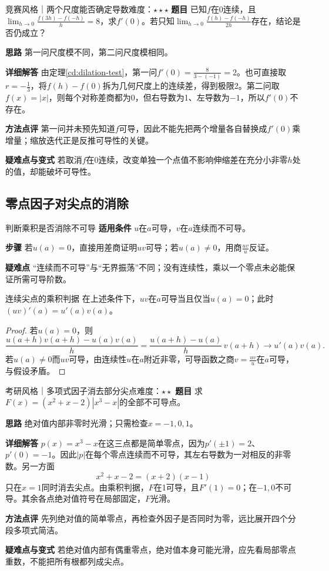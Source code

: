 \begin{example}{竞赛风格｜两个尺度能否确定导数}{难度：$\star\star\star$}\label{cd:ex:dilation}
\textbf{题目} 已知$f$在0连续，且$\lim_{h\to0}\frac{f(3h)-f(-h)}{h}=8$，求$f'(0)$。若只知$\lim_{h\to0}\frac{f(h)-f(-h)}{2h}$存在，结论是否仍成立？\par
\textbf{思路} 第一问尺度模不同，第二问尺度模相同。\par
\textbf{详细解答} 由定理\ref{cd:dilation-test}，第一问$f'(0)=\frac{8}{3-(-1)}=2$。也可直接取$r=-\frac{1}{3}$，将$f(h)-f(0)$拆为几何尺度上的连续差，得到极限2。第二问取$f(x)=|x|$，则每个对称差商都为0，但右导数为1、左导数为$-1$，所以$f'(0)$不存在。\par
\textbf{方法点评} 第一问并未预先知道$f$可导，因此不能先把两个增量各自替换成$f'(0)$乘增量；缩放迭代正是反推可导性的关键。\par
\textbf{疑难点与变式} 若取消$f$在0连续，改变单独一个点值不影响伸缩差在充分小非零$h$处的值，却能破坏可导性。
\end{example}

\subsection{零点因子对尖点的消除}
\begin{method}{判断乘积是否消除不可导}
\textbf{适用条件} $u$在$a$可导，$v$在$a$连续而不可导。\par
\textbf{步骤} 若$u(a)=0$，直接用差商证明$uv$可导；若$u(a)\ne0$，用商$\frac{uv}{u}$反证。\par
\textbf{疑难点} “连续而不可导”与“无界振荡”不同；没有连续性，乘以一个零点未必能保证所需可导阶数。
\end{method}
\begin{theorem}{连续尖点的乘积判据}
在上述条件下，$uv$在$a$可导当且仅当$u(a)=0$；此时$(uv)'(a)=u'(a)v(a)$。
\end{theorem}
\begin{proof}
若$u(a)=0$，则
\[
 \dfrac{u(a+h)v(a+h)-u(a)v(a)}h
 =\dfrac{u(a+h)-u(a)}h\,v(a+h)\to u'(a)v(a).
\]
若$u(a)\ne0$而$uv$可导，由连续性$u$在$a$附近非零，可导函数之商$v=\frac{uv}{u}$在$a$可导，与假设矛盾。
\end{proof}
\begin{example}{考研风格｜多项式因子消去部分尖点}{难度：$\star\star$}\label{cd:ex:kinks}
\textbf{题目} 求$F(x)=(x^2+x-2)|x^3-x|$的全部不可导点。\par
\textbf{思路} 绝对值内部非零时光滑；只需检查$x=-1,0,1$。\par
\textbf{详细解答} $p(x)=x^3-x$在这三点都是简单零点，因为$p'(\pm1)=2$、$p'(0)=-1$。因此$|p|$在每个零点连续而不可导，其左右导数为一对相反的非零数。另一方面
\[
 x^2+x-2=(x+2)(x-1)
\]
只在$x=1$同时消去尖点。由乘积判据，$F$在1可导，且$F'(1)=0$；在$-1,0$不可导。其余各点绝对值符号在局部固定，$F$光滑。\par
\textbf{方法点评} 先列绝对值的简单零点，再检查外因子是否同时为零，远比展开四个分段多项式简洁。\par
\textbf{疑难点与变式} 若绝对值内部有偶重零点，绝对值本身可能光滑，应先看局部零点重数，不能把所有根都列成尖点。
\end{example}

